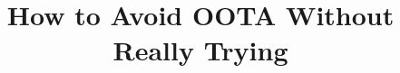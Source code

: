 

\usepackage[T1]{fontenc} %
\usepackage{textcomp} %

\usepackage{microtype}

\usepackage{lscape}
\usepackage{fancyhdr}
\usepackage{subfigure}
\usepackage{url}
\usepackage{graphics}
\usepackage{ifthen}
\usepackage{float}
\usepackage{listings}
\lstset{basicstyle=\ttfamily}



\DeclareUrlCommand\email{}

\pagestyle{plain}



\title{How to Avoid OOTA Without Really Trying}

\newcommand{\co}[1]{\lstinline[breaklines=yes,breakatwhitespace=yes]{#1}}


